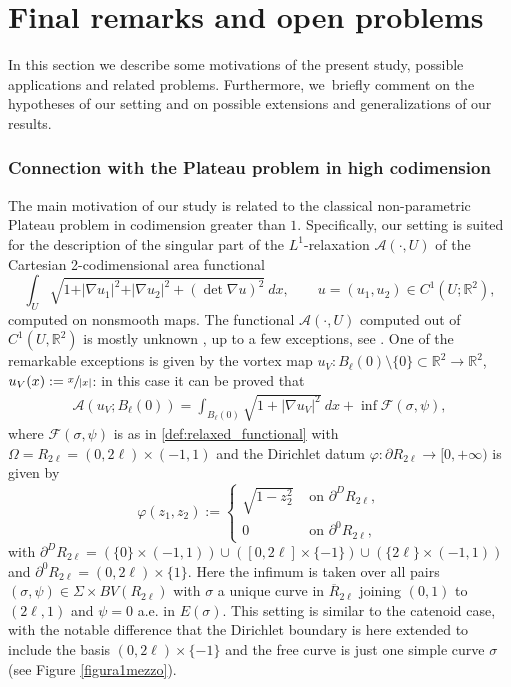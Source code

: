\documentclass[JEP,XML,SOM,Unicode, NoFloatCountersInSection,published]{cedram}
\newcommand{\R}{\mathbb{R}}
\let\grad\nabla
\let\Om\Omega
\theoremstyle{definition}
\begin{document}
\section{Final remarks and open problems}
\label{sec:final_comments_and_open_problems}

In this section we describe some motivations of the present study,
possible applications and related problems.
Furthermore, we~briefly comment on the hypotheses of our setting
and on possible extensions and generalizations of our results.

\subsubsection*{Connection with the Plateau problem in high codimension}
The main motivation of our study is related to the classical non-parametric Plateau problem in codimension greater than $1$. Specifically, our setting is suited for the description of the
singular part of the $L^1$-relaxation
$\mathcal A(\cdot, U)$
of the Cartesian 2-codimensional area functional
\begin{equation}
\label{eq:area_smooth_cod_2}
\int_U \sqrt{1 + \vert \grad u_1\vert^2 + \vert \grad u_2\vert^2 +
(\det\grad u)^2} ~dx, \qquad u = (u_1, u_2) \in C^1(U; \R^2),
\end{equation}
computed on nonsmooth maps.
The functional
$\mathcal A(\cdot, U)$
computed
out of $C^1(U, \R^2)$
is mostly unknown \cite{AcDa:94,GiMoSu:98_2}, up to
a few exceptions, see \cite{BePa:10,BeElPaSc:19,Scala:19,vortex}.
One of the remarkable exceptions is given by
the vortex map
$u_V:B_\ell(0) \setminus \{0\}\subset\R^2\to\R^2$,
$u_V(x):=\sfrac{x}{|x|}$:
in this case it can be proved \cite{BES1,BES2,BES3} that
\begin{align}\label{value_vortex}
\mathcal A(u_V; B_\ell(0))
= \int_{B_\ell(0)}\sqrt{1+|\nabla u_V|^2}~dx+\inf\mathcal F(\sigma,\psi),
\end{align}
where $\mathcal F(\sigma,\psi)$ is as in \eqref{def:relaxed_functional} with
$\Om=R_{2\ell}=(0,2\ell)\times(-1,1)$ and the
Dirichlet datum $\varphi :\partial R_{2\ell}\to [0,+\infty)$
is given by
\begin{equation}\label{vortex}
\varphi(z_1,z_2):=\begin{cases}
\sqrt{1-z_2^2}&\text{ on }\partial^DR_{2\ell},\\
0& \text{ on }\partial^0R_{2\ell},
\end{cases}
\end{equation}
with $\partial^DR_{2\ell}=(\{0\}\times (-1,1))\cup ([0,2\ell]\times \{-1\})\cup (\{2\ell\}\times (-1,1))$
and $\partial^0R_{2\ell}=(0,2\ell)\times \{1\}$.
Here the infimum is taken over all pairs $(\sigma,\psi)\in \Sigma\times BV(R_{2\ell})$ with $\sigma$ a unique curve in $\overline R_{2\ell}$ joining $(0,1)$ to $(2\ell,1)$
and $\psi=0$ a.e. in $E(\sigma)$.
This setting is similar to the catenoid case,
with the notable difference that the Dirichlet boundary is here extended to include the basis $(0,2\ell)\times \{-1\}$ and the free curve
is just one simple curve $\sigma$
(see Figure \ref{figura1mezzo}).
\end{document}
